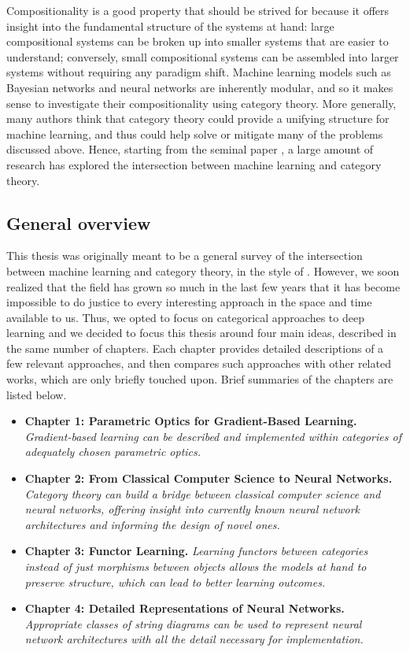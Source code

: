 \documentclass[11pt,a4paper,openright,twoside]{report}
\theoremstyle{plain}
\theoremstyle{definition}
\begin{document}
Compositionality is a good property that should be strived for because it offers insight into the fundamental structure of the systems at hand: large compositional systems can be broken up into smaller systems that are easier to understand; conversely, small compositional systems can be assembled into larger systems without requiring any paradigm shift. Machine learning models such as Bayesian networks and neural networks are inherently modular, and so it makes sense to investigate their compositionality using category theory. More generally, many authors think that category theory could provide a unifying structure for machine learning, and thus could help solve or mitigate many of the problems discussed above. Hence, starting from the seminal paper \cite{fong2019backprop}, a large amount of research has explored the intersection between machine learning and category theory. 

\subsection*{General overview}

This thesis was originally meant to be a general survey of the intersection between machine learning and category theory, in the style of \cite{shiebler2021category}. However, we soon realized that the field has grown so much in the last few years that it has become impossible to do justice to every interesting approach in the space and time available to us. Thus, we opted to focus on categorical approaches to deep learning and we decided to focus this thesis around four main ideas, described in the same number of chapters. Each chapter provides detailed descriptions of a few relevant approaches, and then compares such approaches with other related works, which are only briefly touched upon. Brief summaries of the chapters are listed below.

\begin{itemize}
  \item \textbf{Chapter 1: Parametric Optics for Gradient-Based Learning.} \textit{Gradient-based learning can be described and implemented within categories of adequately chosen parametric optics.}
  \item \textbf{Chapter 2: From Classical Computer Science to Neural Networks.} \textit{Category theory can build a bridge between classical computer science and neural networks, offering insight into currently known neural network architectures and informing the design of novel ones.}
  \item \textbf{Chapter 3: Functor Learning.} \textit{Learning functors between categories instead of just morphisms between objects allows the models at hand to preserve structure, which can lead to better learning outcomes.}
  \item \textbf{Chapter 4: Detailed Representations of Neural Networks.} \textit{Appropriate classes of string diagrams can be used to represent neural network architectures with all the detail necessary for implementation.}
\end{itemize}
\end{document}
